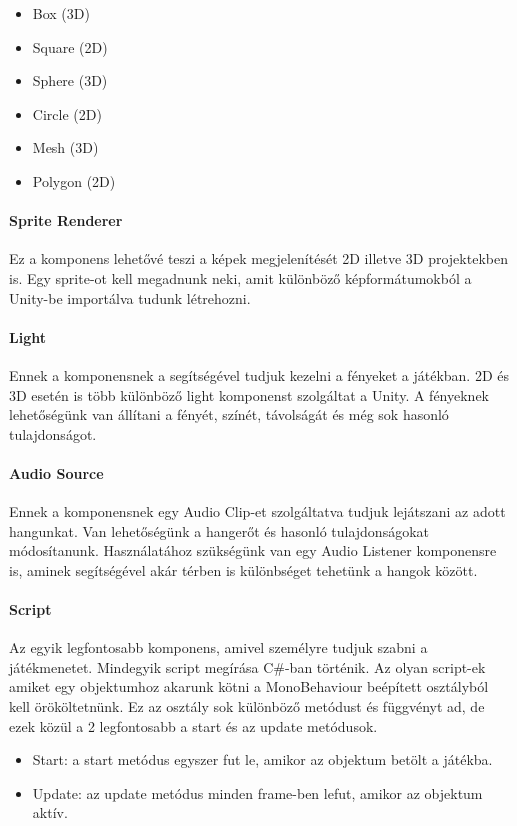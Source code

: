 \documentclass[]{thesis-ekf}
\theoremstyle{definition}
\theoremstyle{remark}
\begin{document}
\begin{itemize}
	\item Box (3D)
	\item Square (2D)
	\item Sphere (3D)
	\item Circle (2D)
	\item Mesh (3D)
	\item Polygon (2D)
\end{itemize}

\paragraph{Sprite Renderer}
Ez a komponens lehetővé teszi a képek megjelenítését 2D illetve 3D projektekben is. Egy sprite-ot kell megadnunk neki, amit különböző képformátumokból a Unity-be importálva tudunk létrehozni. \cite{UnitySpriteRenderer}

\paragraph{Light}
Ennek a komponensnek a segítségével tudjuk kezelni a fényeket a játékban. 2D és 3D esetén is több különböző light komponenst szolgáltat a Unity. A fényeknek lehetőségünk van állítani a fényét, színét, távolságát és még sok hasonló tulajdonságot. \cite{UnityLight}

\paragraph{Audio Source}
Ennek a komponensnek egy Audio Clip-et szolgáltatva tudjuk lejátszani az adott hangunkat. Van lehetőségünk a hangerőt és hasonló tulajdonságokat módosítanunk. Használatához szükségünk van egy Audio Listener komponensre is, aminek segítségével akár térben is különbséget tehetünk a hangok között. \cite{UnityAudioSource}

\paragraph{Script}
Az egyik legfontosabb komponens, amivel személyre tudjuk szabni a játékmenetet. Mindegyik script megírása C\#-ban történik. Az olyan script-ek amiket egy objektumhoz akarunk kötni a MonoBehaviour beépített osztályból kell örököltetnünk. Ez az osztály sok különböző metódust és függvényt ad, de ezek közül a 2 legfontosabb a start és az update metódusok.

\begin{itemize}
	\item Start: a start metódus egyszer fut le, amikor az objektum betölt a játékba.
	\item Update: az update metódus minden frame-ben lefut, amikor az objektum aktív.
\end{itemize}
\end{document}
